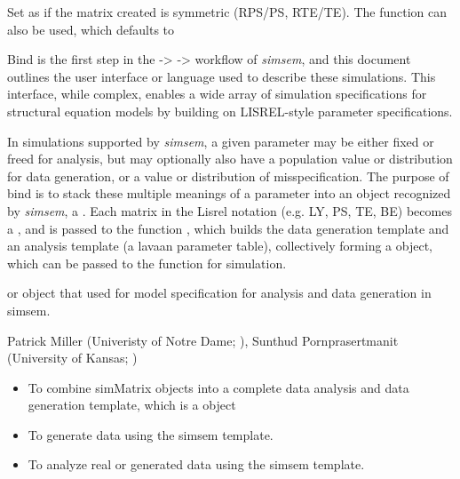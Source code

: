 \documentclass[a4paper]{book}
\begin{document}
\begin{Arguments}
\begin{ldescription}
\item[\code{symmetric}] Set as  if the matrix created is symmetric (RPS/PS, RTE/TE). The function  can also be used, which defaults to  
\end{ldescription}
\end{Arguments}
%
\begin{Details}\relax
Bind is the first step in the  ->  ->  workflow of \emph{simsem}, and this document outlines the user interface or language used to describe these simulations. This interface, while complex, enables a wide array of simulation specifications for structural equation models by building on LISREL-style parameter specifications.

In simulations supported by \emph{simsem}, a given parameter may be either fixed or freed for analysis, but may optionally also have a population value or distribution for data generation, or a value or distribution of misspecification. The purpose of bind is to stack these multiple meanings of a parameter into an object recognized by \emph{simsem}, a . Each matrix in the Lisrel notation (e.g. LY, PS, TE, BE) becomes a , and is passed to the function , which builds the data generation template and an analysis template (a lavaan parameter table), collectively forming a  object, which can be passed to the function  for simulation.
\end{Details}
%
\begin{Value}
  or  object that used for model specification for analysis and data generation in simsem.
\end{Value}
%
\begin{Author}\relax
Patrick Miller (Univeristy of Notre Dame; ),
Sunthud Pornprasertmanit (University of Kansas; )
\end{Author}
%
\begin{SeeAlso}\relax
\begin{itemize}
\item {} To combine simMatrix objects into a complete data analysis and data generation template, which is a  object
\item {} To generate data using the simsem template.
\item {} To analyze real or generated data using the simsem template.

\end{itemize}

\end{SeeAlso}
\end{document}
